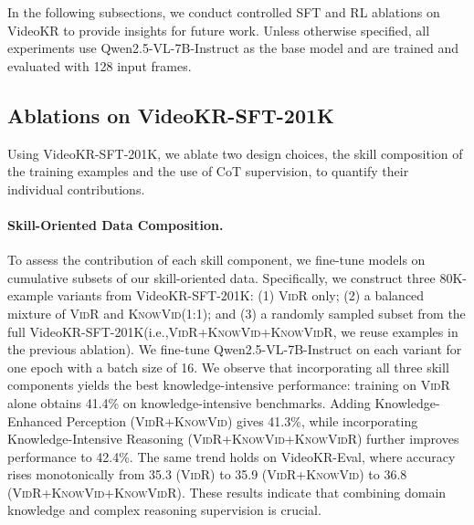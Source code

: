 \documentclass{llmxive}
\providecommand{\ie}{i.e.,\xspace}
\providecommand{\eval}{VideoKR-Eval\xspace}
\providecommand{\sftdata}{VideoKR-SFT-201K\xspace}
\providecommand{\ours}{VideoKR\xspace}
\providecommand{\vr}{\textsc{VidR}\xspace}
\providecommand{\kv}{\textsc{KnowVid}\xspace}
\providecommand{\kvr}{\textsc{KnowVidR}\xspace}
\begin{document}
In the following subsections, we conduct controlled SFT and RL ablations on \ours to provide insights for future work. Unless otherwise specified, all experiments use Qwen2.5-VL-7B-Instruct as the base model and are trained and evaluated with 128 input frames.

\subsection{Ablations on \sftdata}
\label{sec:6.3}
Using \sftdata, we ablate two design choices, the skill composition of the training examples and the use of CoT supervision, to quantify their individual contributions.

\vspace{-8pt}
\paragraph{Skill-Oriented Data Composition.}
To assess the contribution of each skill component, we fine-tune models on cumulative subsets of our skill-oriented data. Specifically, we construct three 80K-example variants from \sftdata: (1) \vr only; (2) a balanced mixture of \vr and \kv (1:1); and (3) a randomly sampled subset from the full \sftdata (\ie \vr+\kv+\kvr, we reuse examples in the previous ablation). We fine-tune Qwen2.5-VL-7B-Instruct on each variant for one epoch with a batch size of 16.
We observe that incorporating all three skill components yields the best knowledge-intensive performance: training on \vr alone obtains 41.4\% on knowledge-intensive benchmarks. Adding Knowledge-Enhanced Perception (\vr+\kv) gives 41.3\%, while incorporating Knowledge-Intensive Reasoning (\vr+\kv+\kvr) further improves performance to 42.4\%. The same trend holds on \eval, where accuracy rises monotonically from 35.3 (\vr) to 35.9 (\vr+\kv) to 36.8 (\vr+\kv+\kvr). These results indicate that combining domain knowledge and complex reasoning supervision is crucial.
\end{document}
